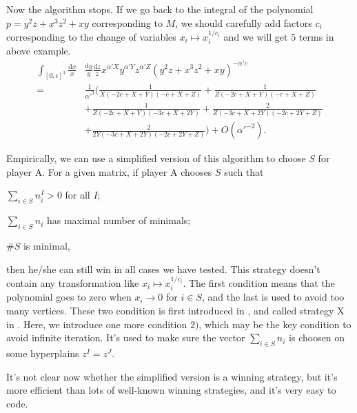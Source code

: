 \documentclass[12pt]{article}
\theoremstyle{definition}
\newtheorem{defi}[para]{Definition}
\theoremstyle{plain}
\newcommand{\dif}{\mathrm{d}} %
\begin{document}
Now the algorithm stops. If we go back to the integral of the polynomial $p=y^2z+x^3z^2+xy$
corresponding to $M$, we should carefully add factors $c_i$
corresponding to the change of variables $x_i\mapsto x_i^{1/c_i}$ and we will get $5$ terms 
in above example.
\begin{align*}
	\int_{[0,\epsilon]^3}\frac{\dif x}{x}&\frac{\dif y}{y}\frac{\dif z}{z}
	x^{\alpha' X}y^{\alpha' Y}z^{\alpha' Z}(y^2z+x^3z^2+xy)^{-\alpha' c}\\
	=\,&\frac{1}{{\alpha'}^3}\biggl(
	\frac{1}{X (-2 c+X+Y) (-c+X+Z)}+\frac{1}{Z (-2 c+X+Y) (-c+X+Z)}\\
	&+\frac{1}{Z (-2 c+X+Y) (-3 c+X+2 Y)}+
	\frac{2}{Z (-3 c+X+2 Y) (-2 c+2 Y+Z)}\\
	&+\frac{2}{2 Y (-3 c+X+2 Y) (-2 c+2 Y+Z)}
	\biggr) +O({\alpha'}^{-2}).
\end{align*}

Empirically, we can use a simplified version of this algorithm to choose $S$ for player A.
For a given matrix, if player A chooses $S$ such that 
\begin{compactenum}[\quad\, 1)]
\item $\sum_{i\in S} n_i^I>0$ for all $I$;
\item $\sum_{i\in S} n_i$ has maximal number of minimals;
\item $\#S$ is minimal,
\end{compactenum}
then he/she can still win in all cases we have tested. 
This strategy doesn't contain any transformation like $x_i\mapsto x_i^{1/c_i}$. The first 
condition means that the polynomial goes to zero when $x_i\to 0$ for $i\in S$, and
the last is used to avoid too many vertices. These two condition is first
introduced in \cite{Binoth:2000ps}, and called strategy X in \cite{bogner2009mathematical}.
Here, we introduce one more condition $2)$, which may be the key condition to avoid 
infinite iteration. It's used to make sure the vector $\sum_{i\in S} n_i$
is choosen on some hyperplains $z^I=z^J$.

It's not clear now whether the simplified version is a winning strategy,
but it's more efficient than lots of well-known winning strategies, and it's 
very easy to code.

 
\end{document}
